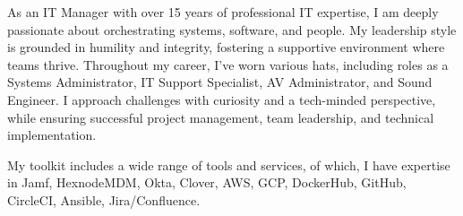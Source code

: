 

\begin{cvparagraph}

  As an IT Manager with over 15 years of professional IT expertise, I am deeply passionate about orchestrating systems, software, and people. My leadership style is grounded in humility and integrity, fostering a supportive environment where teams thrive. Throughout my career, I’ve worn various hats, including roles as a Systems Administrator, IT Support Specialist, AV Administrator, and Sound Engineer. I approach challenges with curiosity and a tech-minded perspective, while ensuring successful project management, team leadership, and technical implementation.  

My toolkit includes a wide range of tools and services, of which, I have expertise in Jamf, HexnodeMDM, Okta, Clover, AWS, GCP, DockerHub, GitHub, CircleCI, Ansible, Jira/Confluence.
\end{cvparagraph}
